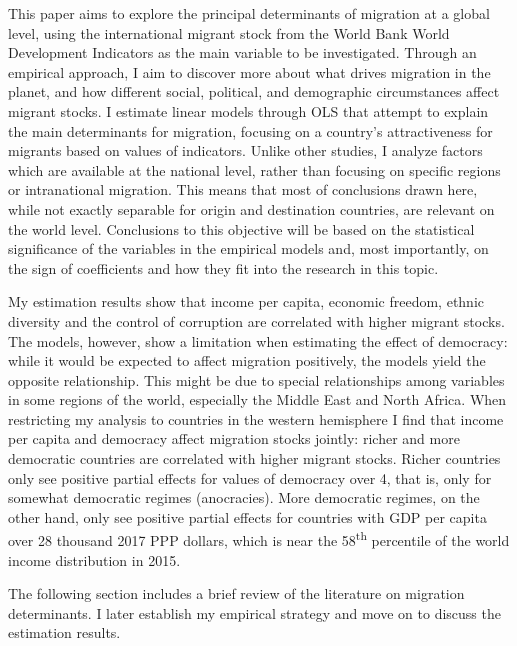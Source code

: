 \documentclass[../main.tex]{subfiles}
\begin{document}
This paper aims to explore the principal determinants of migration at a global level, using the international migrant stock from the World Bank World Development Indicators as the main variable to be investigated. Through an empirical approach, I aim to discover more about what drives migration in the planet, and how different social, political, and demographic circumstances affect migrant stocks. I estimate linear models through OLS that attempt to explain the main determinants for migration, focusing on a country’s attractiveness for migrants based on values of indicators. Unlike other studies, I analyze factors which are available at the national level, rather than focusing on specific regions or intranational migration. This means that most of conclusions drawn here, while not exactly separable for origin and destination countries, are relevant on the world level. Conclusions to this objective will be based on the statistical significance of the variables in the empirical models and, most importantly, on the sign of coefficients and how they fit into the research in this topic. 

My estimation results show that income per capita, economic freedom, ethnic diversity and the control of corruption are correlated with higher migrant stocks. The models, however, show a limitation when estimating the effect of democracy: while it would be expected to affect migration positively, the models yield the opposite relationship. This might be due to special relationships among variables in some regions of the world, especially the Middle East and North Africa. When restricting my analysis to countries in the western hemisphere I find that income per capita and democracy affect migration stocks jointly: richer and more democratic countries are correlated with higher migrant stocks. Richer countries only see positive partial effects for values of democracy over 4, that is, only for somewhat democratic regimes (anocracies). More democratic regimes, on the other hand, only see positive partial effects for countries with GDP per capita over 28 thousand 2017 PPP dollars, which is near the 58\textsuperscript{th} percentile of the world income distribution in 2015.

The following section includes a brief review of the literature on migration determinants. I later establish my empirical strategy and move on to discuss the estimation results. 
\end{document}
